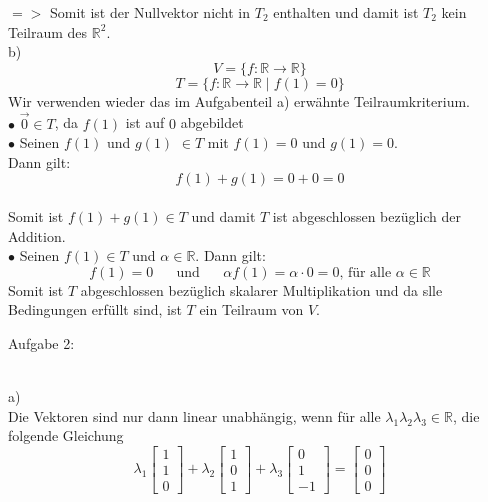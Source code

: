 \documentclass[11pt]{article}
\begin{document}
				$=>$ Somit ist der Nullvektor nicht in $T_2$ enthalten und damit ist $T_2$ kein Teilraum des $\mathbb{R}^2$.\\
\newpage
			\indent b)\\
				$$V=\{f: \mathbb{R} \longrightarrow \mathbb{R}\}$$
				$$T=\{f: \mathbb{R} \longrightarrow \mathbb{R} \mid f(1)=0\}$$
				Wir verwenden wieder das im Aufgabenteil a) erwähnte Teilraumkriterium.\\
				\indent $\bullet$ $\vec{0} \in T$, da $f(1)$ ist auf $0$ abgebildet\\
				\indent $\bullet$ Seinen $f(1)$ und $g(1)$ $\in T$ mit $f(1)=0$ und $g(1)=0$.\\
				Dann gilt: $$f(1)+g(1)= 0+0=0$$\\
				Somit ist $f(1)+g(1) \in T$ und damit $T$ ist abgeschlossen bezüglich der Addition.\\
				\indent $\bullet$ Seinen $f(1) \in T$ und $\alpha \in \mathbb{R}$. Dann gilt:\\
				$$f(1)=0 \hspace{20pt} \text{und} \hspace{20pt} \alpha f(1)= \alpha \cdot 0 = 0 \text{, für alle } \alpha \in \mathbb{R}$$
				Somit ist $T$ abgeschlossen bezüglich skalarer Multiplikation und da slle Bedingungen erfüllt sind, ist $T$ ein Teilraum von $V$.\\
		\noindent \begin{Large}Aufgabe 2:\end{Large}\\[2pt]
			\indent a)\\
				Die Vektoren sind nur dann linear unabhängig, wenn für alle $\lambda_1 \lambda_2 \lambda_3 \in \mathbb{R}$, die folgende Gleichung\\
				$$\lambda_1 \begin{bmatrix}1\\1\\0\end{bmatrix} +
				\lambda_2 \begin{bmatrix}1\\0\\1\end{bmatrix} +
				\lambda_3 \begin{bmatrix}0\\1\\-1\end{bmatrix} = \begin{bmatrix}0\\0\\0\end{bmatrix}$$
\end{document}
